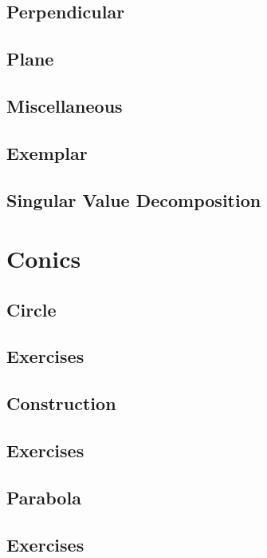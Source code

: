 \documentclass[11pt]{book}
\begin{document}
\section{Perpendicular}

\section{Plane}

\section{Miscellaneous }

\section{Exemplar}

\section{Singular Value Decomposition}

%
\chapter{Conics}
\section{Circle}

\section{Exercises}

\section{Construction}

\section{Exercises}

\section{Parabola}

\section{Exercises}

\end{document}
